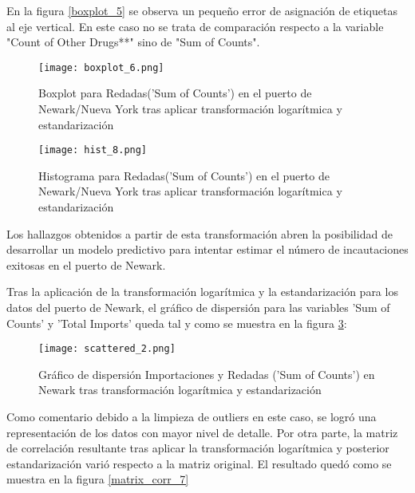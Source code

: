 \documentclass[12pt]{article}
\begin{document}
		En la figura \ref{boxplot_5} se observa un pequeño error de asignación de etiquetas al eje vertical. En este caso no se trata de comparación respecto a la variable "Count of  Other Drugs**" sino de "Sum of Counts".
		
		
		
		\begin{figure}[H]
			\caption{\label{boxplot_6} Boxplot para Redadas('Sum of Counts') en el puerto de Newark/Nueva York tras aplicar transformación logarítmica y estandarización}
			\centering
			\hspace*{1cm}
			\texttt{[image: boxplot\_6.png]}
		\end{figure}
		
		\begin{figure}[H]
			\caption{\label{hist_8} Histograma para Redadas('Sum of Counts') en el puerto de Newark/Nueva York tras aplicar transformación logarítmica y estandarización}
			\centering
			\hspace*{1cm}
			\texttt{[image: hist\_8.png]}
		\end{figure}
		
		Los hallazgos obtenidos a partir de esta transformación abren la posibilidad de desarrollar un modelo predictivo para intentar estimar el número de incautaciones exitosas en el puerto de Newark.
		
		Tras la aplicación de la transformación logarítmica y la estandarización para los datos del puerto de Newark, el gráfico de dispersión para las variables 'Sum of Counts' y 'Total Imports' queda tal y como se muestra en la figura \ref{scattered_2}:
		
		\begin{figure}[H]
			\caption{\label{scattered_2} Gráfico de dispersión Importaciones y Redadas ('Sum of Counts') en Newark tras transformación logarítmica y estandarización }
			\centering
			\hspace*{1cm}
			\texttt{[image: scattered\_2.png]}
		\end{figure}
	
		Como comentario debido a la limpieza de outliers en este caso, se logró una representación de los datos con mayor nivel de detalle. Por otra parte, la matriz de correlación resultante tras aplicar la transformación logarítmica y posterior estandarización varió respecto a la matriz original. El resultado quedó como se muestra en la figura \ref{matrix_corr_7}
		
\end{document}
